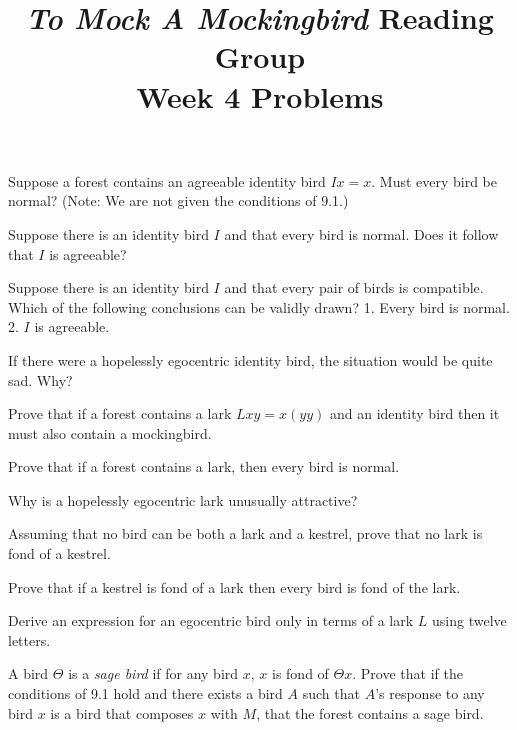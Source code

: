 \documentclass[12pt, letterpaper]{article}
\title{\emph{To Mock A Mockingbird} Reading Group\\Week 4 Problems}
\begin{document}
\maketitle

\disclaimer

\begin{prob}{9.20}
Suppose a forest contains an agreeable identity bird $Ix = x$. Must every bird be normal? (Note: We are not given the conditions of 9.1.)
\end{prob}

\begin{prob}{9.21}
Suppose there is an identity bird $I$ and that every bird is normal. Does it follow that $I$ is agreeable?
\end{prob}

\begin{prob}{9.22}
Suppose there is an identity bird $I$ and that every pair of birds is compatible. Which of the following conclusions can be validly drawn? 1. Every bird is normal. 2. $I$ is agreeable.
\end{prob}

\begin{prob}{9.23}
If there were a hopelessly egocentric identity bird, the situation would be quite sad. Why?
\end{prob}

\begin{prob}{9.24}
Prove that if a forest contains a lark $Lxy = x(yy)$ and an identity bird then it must also contain a mockingbird.
\end{prob}

\begin{prob}{9.25}
Prove that if a forest contains a lark, then every bird is normal.
\end{prob}

\begin{prob}{9.26}
Why is a hopelessly egocentric lark unusually attractive?
\end{prob}

\begin{prob}{9.27}
Assuming that no bird can be both a lark and a kestrel, prove that no lark is fond of a kestrel.
\end{prob}

\begin{prob}{9.28}
Prove that if a kestrel is fond of a lark then every bird is fond of the lark.
\end{prob}

\begin{prob}{9.29}
Derive an expression for an egocentric bird only in terms of a lark $L$ using twelve letters.
\end{prob}

\begin{prob}{10.1}
A bird $\Theta$ is a \emph{sage bird} if for any bird $x$, $x$ is fond of $\Theta x$. Prove that if the conditions of 9.1 hold and there exists a bird $A$ such that $A$'s response to any bird $x$ is a bird that composes $x$ with $M$, that the forest contains a sage bird.
\end{prob}
\end{document}
